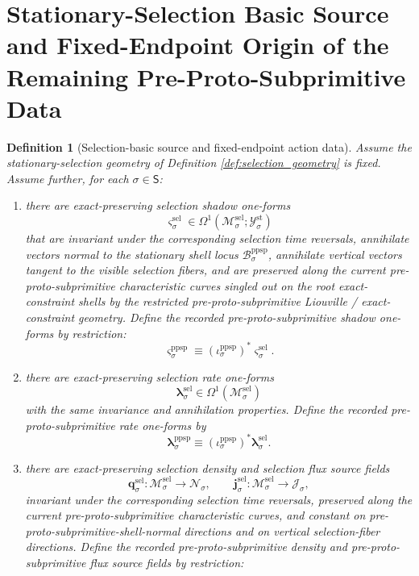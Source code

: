 \documentclass[11pt]{article}
\newcommand{\SectorSet}{\mathsf S}
\newcommand{\StatTagClass}[1]{\mathcal Y_{#1}^{\mathrm{st}}}
\newcommand{\DensityClass}[1]{\mathscr N_{#1}}
\newcommand{\FluxClass}[1]{\mathscr J_{#1}}
\newcommand{\PreProtoSubprimSpace}[1]{\mathcal B_{#1}^{\mathrm{ppsp}}}
\newcommand{\PreProtoSubprimInc}[1]{\iota_{#1}^{\mathrm{ppsp}}}
\newcommand{\PreProtoSubprimShadowForm}[1]{\boldsymbol{\varsigma}_{#1}^{\mathrm{ppsp}}}
\newcommand{\PreProtoSubprimRateForm}[1]{\boldsymbol{\lambda}_{#1}^{\mathrm{ppsp}}}
\newcommand{\SelSpace}[1]{\mathcal M_{#1}^{\mathrm{sel}}}
\newcommand{\SelShadowForm}[1]{\boldsymbol{\varsigma}_{#1}^{\mathrm{sel}}}
\newcommand{\SelRateForm}[1]{\boldsymbol{\lambda}_{#1}^{\mathrm{sel}}}
\newcommand{\SelDensitySource}[1]{\boldsymbol{q}_{#1}^{\mathrm{sel}}}
\newcommand{\SelFluxSource}[1]{\boldsymbol{j}_{#1}^{\mathrm{sel}}}
\newtheorem{definition}{Definition}
\begin{document}
\section{Stationary-Selection Basic Source and Fixed-Endpoint Origin of the Remaining Pre-Proto-Subprimitive Data}

\begin{definition}[Selection-basic source and fixed-endpoint action data]
\label{def:selection_basic}
Assume the stationary-selection geometry of Definition \ref{def:selection_geometry} is fixed. Assume further, for each \(\sigma\in\SectorSet\):
\begin{enumerate}
    \item there are exact-preserving selection shadow one-forms
    \[
    \SelShadowForm{\sigma}\in\Omega^1(\SelSpace{\sigma};\StatTagClass{\sigma})
    \]
    that are invariant under the corresponding selection time reversals, annihilate vectors normal to the stationary shell locus \(\PreProtoSubprimSpace{\sigma}\), annihilate vertical vectors tangent to the visible selection fibers, and are preserved along the current pre-proto-subprimitive characteristic curves singled out on the root exact-constraint shells by the restricted pre-proto-subprimitive Liouville / exact-constraint geometry. Define the recorded pre-proto-subprimitive shadow one-forms by restriction:
    \begin{equation}
    \PreProtoSubprimShadowForm{\sigma}\equiv (\PreProtoSubprimInc{\sigma})^*\SelShadowForm{\sigma}.
    \label{eq:preproto_shadow_from_selection}
    \end{equation}
    \item there are exact-preserving selection rate one-forms
    \[
    \SelRateForm{\sigma}\in\Omega^1(\SelSpace{\sigma})
    \]
    with the same invariance and annihilation properties. Define the recorded pre-proto-subprimitive rate one-forms by
    \begin{equation}
    \PreProtoSubprimRateForm{\sigma}\equiv (\PreProtoSubprimInc{\sigma})^*\SelRateForm{\sigma}.
    \label{eq:preproto_rate_from_selection}
    \end{equation}
    \item there are exact-preserving selection density and selection flux source fields
    \[
    \SelDensitySource{\sigma}:\SelSpace{\sigma}\to\DensityClass{\sigma},
    \qquad
    \SelFluxSource{\sigma}:\SelSpace{\sigma}\to\FluxClass{\sigma},
    \]
    invariant under the corresponding selection time reversals, preserved along the current pre-proto-subprimitive characteristic curves, and constant on pre-proto-subprimitive-shell-normal directions and on vertical selection-fiber directions. Define the recorded pre-proto-subprimitive density and pre-proto-subprimitive flux source fields by restriction:

\end{enumerate}
\end{definition}
\end{document}
